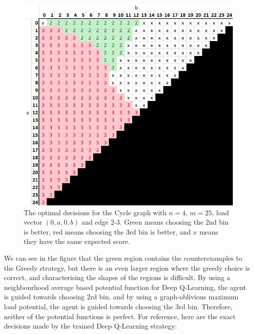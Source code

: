 \begin{figure}[h!] \label{greedy-counterexample-analysed}
    \centering
    \includegraphics[scale=1.0]{Chapter4/Figs/0a0b_4_25_analysis.png}
    \caption{The optimal decisions for the Cycle graph with $n=4$, $m=25$, load vector $(0,a,0,b)$ and edge $2$-$3$. Green means choosing the $2$nd bin is better, red means choosing the $3$rd bin is better, and $x$ means they have the same expected score.}
\end{figure}


We can see in the figure that the green region contains the counterexamples to the Greedy strategy, but there is an even larger region where the greedy choice is correct, and characterising the shapes of the regions is difficult. By using a neighbourhood average based potential function for Deep Q-Learning, the agent is guided towards choosing $2$rd bin, and by using a graph-oblivious maximum load potential, the agent is guided towards choosing the $3$rd bin. Therefore, neither of the potential functions is perfect. For reference, here are the exact decisions made by the trained Deep Q-Learning strategy: 


